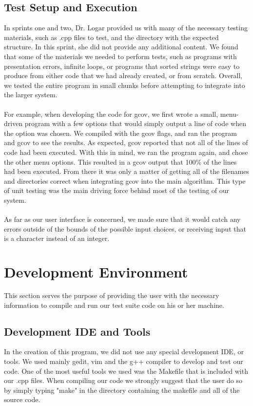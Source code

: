 \documentclass {article}
\begin{document}
		\subsection{\Large{\color{blue}Test Setup and Execution}}
			In sprints one and two, Dr. Logar provided us with many of the necessary testing
			 materials, such as .cpp files to test, and the directory with the expected structure.
			 In this sprint, she did not provide any additional content. We found that some of
			 the materials we needed to perform tests, such as programs with presentation errors,
			 infinite loops, or programs that sorted strings were easy to produce from either
			 code that we had already created, or from scratch. Overall, we tested the entire
			 program in small chunks before attempting to integrate into the larger system.
			 \\ \ \\For example, when developing the code for gcov, we first wrote a small,
			 menu-driven program with a few options that would simply output a line of code when
			 the option was chosen. We compiled with the gcov flags, and ran the program and gcov
			 to see the results. As expected, gcov reported that not all of the lines of code had
			 been executed. With this in mind, we ran the program again, and chose the other
			 menu options. This resulted in a gcov output that 100\% of the lines had been
			 executed. From there it was only a matter of getting all of the filenames and
			 directories correct when integrating gcov into the main algorithm. This type of
			 unit testing was the main driving force behind most of the testing of our system.
			 \\ \ \\As far as our user interface is concerned, we made sure that it would catch
			 any errors outside of the bounds of the possible input choices, or receiving input
			 that is a character instead of an integer.
			 
	\newpage
	
	\section{\LARGE{\color{blue}Development Environment}}
		This section serves the purpose of providing the user with the necessary information
		 to compile and run our test suite code on his or her machine.
		 
		\subsection{\Large{\color{blue}Development IDE and Tools}}
			In the creation of this program, we did not use any special development IDE, or tools.
			 We used mainly gedit, vim and the g++ compiler to develop and test our code. One of
			 the most useful tools we used was the Makefile that is included with our .cpp files.
			 When compiling our code we strongly suggest that the user do so by simply typing
			 "make" in the directory containing the makefile and all of the source code.
			 
\end{document}
